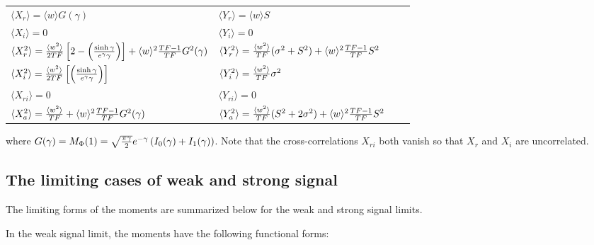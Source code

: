 \vspace{-10pt}
\begin{center}
\begin{tabular}{llll}
$ \langle X_r\rangle     = \langle w\rangle G(\gamma)$ &
$ \langle Y_r\rangle     = \langle w\rangle S$ \\
$ \langle X_i\rangle     = 0$ &
$ \langle Y_i\rangle     = 0$ \\
$ \langle X_r^2\rangle   = {\langle w^2\rangle \over2TF}\left[2 - \left({\sinh\gamma\over e^{\gamma}\gamma}\right)\right] + \langle w\rangle ^2{TF-1\over TF}G^2(\gamma)$ &
$ \langle Y_r^2\rangle   = {\langle w^2\rangle \over TF}(\sigma^2 + S^2) + \langle w\rangle ^2{TF-1\over TF}S^2$ \\
$ \langle X_i^2\rangle   = {\langle w^2\rangle \over2TF}\left[\left({\sinh\gamma\over e^{\gamma}\gamma}\right)\right]$ &
$ \langle Y_i^2\rangle   = {\langle w^2\rangle \over TF}\sigma^2$ \\
$ \langle X_{ri}\rangle  = 0$ &
$ \langle Y_{ri}\rangle  = 0$ \\
$ \langle X_a^2\rangle   = {\langle w^2\rangle \over TF} + \langle w\rangle ^2{TF-1\over TF}G^2(\gamma)$ &
$ \langle Y_a^2\rangle   = {\langle w^2\rangle \over TF}(S^2 + 2\sigma^2) + \langle w\rangle ^2{TF-1\over TF}S^2$
\end{tabular}
\end{center}
\vspace{-10pt}

where $G(\gamma) = M_\Phi(1) = \sqrt{\pi\gamma\over2}e^{-\gamma}
            \left(I_0(\gamma) +  I_1(\gamma) \right)$.  Note that the
cross-correlations $X_{ri}$ both vanish so that $X_r$ and $X_i$ are
uncorrelated.

\subsection{The limiting cases of weak and strong signal}

The limiting forms of the moments are summarized below for the weak
and strong signal limits.

In the weak signal limit, the moments have the following functional
forms:

